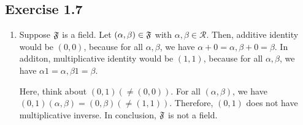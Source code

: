 \documentclass{article}
\theoremstyle{thmstyleone}
\theoremstyle{thmstyletwo}
\theoremstyle{thmstylethree}
\newcommand\R{\mathcal R}
\begin{document}
\subsection{Exercise 1.7}
\begin{enumerate}[label = (\alph*)]
\item
Suppose $\mathfrak F$ is a field.
Let $(\alpha,\beta) \in \mathfrak F$ with $\alpha,\beta \in \R$. 
Then, additive identity would be $(0,0)$, because for all $\alpha,\beta$, we have $\alpha + 0 = \alpha, \beta + 0 = \beta$.
In additon, multiplicative identity would be $(1,1)$, because for all $\alpha,\beta$, we have $\alpha1 = \alpha, \beta1 = \beta$.

Here, think about $(0,1) (\ne (0,0))$.
For all $(\alpha, \beta)$, we have $(0,1)(\alpha, \beta) = (0, \beta) (\ne (1,1))$. Therefore, $(0,1)$ does not have multiplicative inverse.
In conclusion, $\mathfrak F$ is not a field. 


\end{enumerate}
\end{document}
